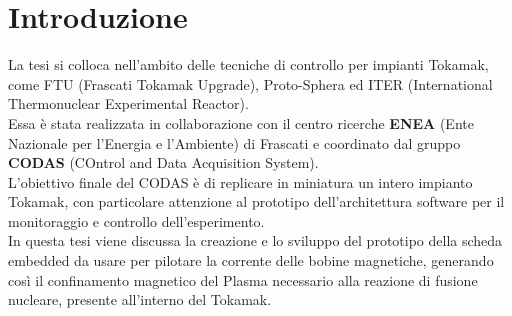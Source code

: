 \chapter*{Introduzione}
La tesi si colloca nell'ambito delle tecniche di controllo per impianti Tokamak, come FTU (Frascati Tokamak Upgrade), Proto-Sphera ed ITER (International Thermonuclear Experimental Reactor).\\
Essa è stata realizzata in collaborazione con il centro ricerche \textbf{ENEA} (Ente Nazionale per l’Energia e l’Ambiente) di Frascati e coordinato dal gruppo \textbf{CODAS} (COntrol and Data Acquisition System).\\
L'obiettivo finale del CODAS è di replicare in miniatura un intero impianto Tokamak, con particolare attenzione al prototipo dell'architettura software per il monitoraggio e controllo dell'esperimento.\\
In questa tesi viene discussa la creazione e lo sviluppo del prototipo della scheda embedded da usare per pilotare la corrente delle bobine magnetiche, generando così il confinamento magnetico del Plasma necessario alla reazione di fusione nucleare, presente all'interno del Tokamak.


